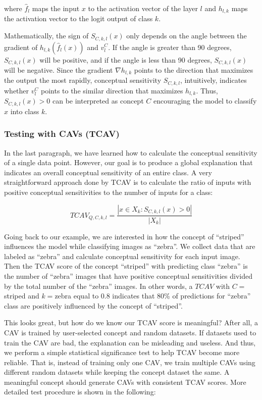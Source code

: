 \documentclass[
  10pt,
]{scrbook}
\begin{document}
where \(\hat{f}_l\) maps the input \(x\) to the activation vector of the layer \(l\) and \(h_{l,k}\) maps the activation vector to the logit output of class \(k\).

Mathematically, the sign of \(S_{C,k,l}(x)\) only depends on the angle between the gradient of \(h_{l,k}(\hat{f}_l(x))\) and \(v_l^C\).
If the angle is greater than 90 degrees, \(S_{C,k,l}(x)\) will be positive, and if the angle is less than 90 degrees, \(S_{C,k,l}(x)\) will be negative.
Since the gradient \(\nabla h_{l,k}\) points to the direction that maximizes the output the most rapidly, conceptual sensitivity \(S_{C,k,l}\), intuitively, indicates whether \(v_l^C\) points to the similar direction that maximizes \(h_{l,k}\).
Thus, \(S_{C,k,l}(x)>0\) can be interpreted as concept \(C\) encouraging the model to classify \(x\) into class \(k\).

\hypertarget{testing-with-cavs-tcav}{%
\subsubsection{Testing with CAVs (TCAV)}\label{testing-with-cavs-tcav}}

In the last paragraph, we have learned how to calculate the conceptual sensitivity of a single data point.
However, our goal is to produce a global explanation that indicates an overall conceptual sensitivity of an entire class.
A very straightforward approach done by TCAV is to calculate the ratio of inputs with positive conceptual sensitivities to the number of inputs for a class:

\[TCAV_{Q,C,k,l}=\frac{|{x\in X_k:S_{C,k,l}(x)>0}|}{|X_k|}\]

Going back to our example, we are interested in how the concept of ``striped'' influences the model while classifying images as ``zebra''.
We collect data that are labeled as ``zebra'' and calculate conceptual sensitivity for each input image.
Then the TCAV score of the concept ``striped'' with predicting class ``zebra'' is the number of ``zebra'' images that have positive conceptual sensitivities divided by the total number of the ``zebra'' images.
In other words, a \(TCAV\) with \(C=\)striped and \(k=\)zebra equal to 0.8 indicates that 80\% of predictions for ``zebra'' class are positively influenced by the concept of ``striped''.

This looks great, but how do we know our TCAV score is meaningful?
After all, a CAV is trained by user-selected concept and random datasets.
If datasets used to train the CAV are bad, the explanation can be misleading and useless.
And thus, we perform a simple statistical significance test to help TCAV become more reliable.
That is, instead of training only one CAV, we train multiple CAVs using different random datasets while keeping the concept dataset the same.
A meaningful concept should generate CAVs with consistent TCAV scores.
More detailed test procedure is shown in the following:
\end{document}
